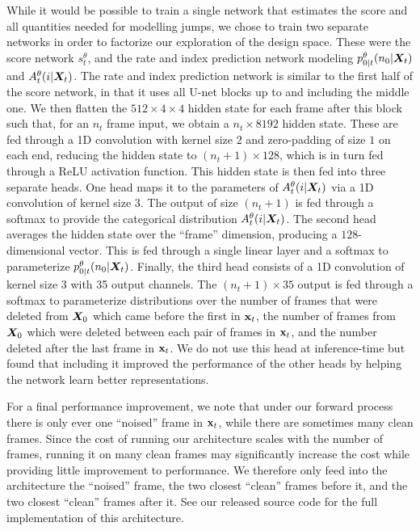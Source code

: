 While it would be possible to train a single network that estimates the score and all quantities needed for modelling jumps, we chose to train two separate networks in order to factorize our exploration of the design space. These were the score network $s_t^\theta$, and the rate and index prediction network modeling $p_{0|t}^\theta(n_0 | {\bm{X}}_t)$ and $A_t^\theta(i | {\bm{X}}_t)$. The rate and index prediction network is similar to the first half of the score network, in that it uses all U-net blocks up to and including the middle one. We then flatten the $512\times4\times4$ hidden state for each frame after this block such that, for an $n_t$ frame input, we obtain a $n_t \times 8192$ hidden state. These are fed through a 1D convolution with kernel size $2$ and zero-padding of size $1$ on each end, reducing the hidden state to $(n_t+1) \times 128$, which is in turn fed through a ReLU activation function. This hidden state is then fed into three separate heads. One head maps it to the parameters of $A_t^\theta(i | {\bm{X}}_t)$ via a 1D convolution of kernel size 3. The output of size $(n_t+1)$ is fed through a softmax to provide the categorical distribution $A_t^\theta(i | {\bm{X}}_t)$. The second head averages the hidden state over the ``frame'' dimension, producing a $128$-dimensional vector. This is fed through a single linear layer and a softmax to parameterize $p_{0|t}^\theta(n_0 | {\bm{X}}_t)$. Finally, the third head consists of a 1D convolution of kernel size 3 with 35 output channels. The $(n_t+1)\times35$ output is fed through a softmax to parameterize distributions over the number of frames that were deleted from ${\bm{X}}_0$ which came before the first in ${\mathbf{x}}_t$, the number of frames from ${\bm{X}}_0$ which were deleted between each pair of frames in ${\mathbf{x}}_t$, and the number deleted after the last frame in ${\mathbf{x}}_t$. We do not use this head at inference-time but found that including it improved the performance of the other heads by helping the network learn better representations. 

For a final performance improvement, we note that under our forward process there is only ever one ``noised'' frame in ${\mathbf{x}}_t$, while there are sometimes many clean frames. Since the cost of running our architecture scales with the number of frames, running it on many clean frames may significantly increase the cost while providing little improvement to performance. We therefore only feed into the architecture the ``noised'' frame, the two closest ``clean'' frames before it, and the two closest ``clean'' frames after it. See our released source code for the full implementation of this architecture.

